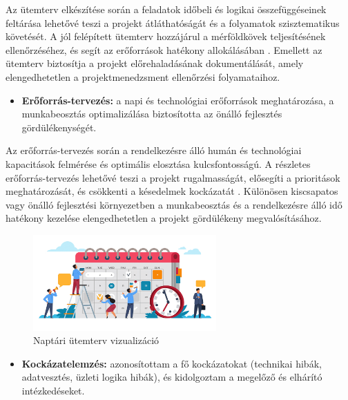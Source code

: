 Az ütemterv elkészítése során a feladatok időbeli és logikai összefüggéseinek feltárása lehetővé teszi a projekt átláthatóságát és a folyamatok szisztematikus követését. 
A jól felépített ütemterv hozzájárul a mérföldkövek teljesítésének ellenőrzéséhez, 
és segít az erőforrások hatékony allokálásában \cite{Kovacs2016,Kaposi2019}. Emellett az ütemterv biztosítja a projekt 
előrehaladásának dokumentálását, amely elengedhetetlen a projektmenedzsment ellenőrzési folyamataihoz.

\begin{itemize}
    \item \textbf{Erőforrás-tervezés:} a napi és technológiai erőforrások meghatározása, a munkabeosztás optimalizálása biztosította az önálló fejlesztés gördülékenységét.
\end{itemize}

Az erőforrás-tervezés során a rendelkezésre álló humán és technológiai kapacitások felmérése és optimális elosztása kulcsfontosságú. 
A részletes erőforrás-tervezés lehetővé teszi a projekt rugalmasságát, 
elősegíti a prioritások meghatározását, és csökkenti a késedelmek kockázatát \cite{Hajdu2014,Szalay2018}. 
Különösen kiscsapatos vagy önálló fejlesztési környezetben a munkabeosztás és a rendelkezésre álló idő hatékony kezelése elengedhetetlen a projekt gördülékeny megvalósításához.

\begin{figure}[H]
    \centering
    \includegraphics[width=70mm, keepaspectratio]{figures/plan.png}
    \caption{Naptári ütemterv vizualizáció}
    \label{fig:plan}
\end{figure}

\begin{itemize}
    \item \textbf{Kockázatelemzés:} azonosítottam a fő kockázatokat (technikai hibák, adatvesztés, üzleti logika hibák), és kidolgoztam a megelőző és elhárító intézkedéseket.
\end{itemize}

